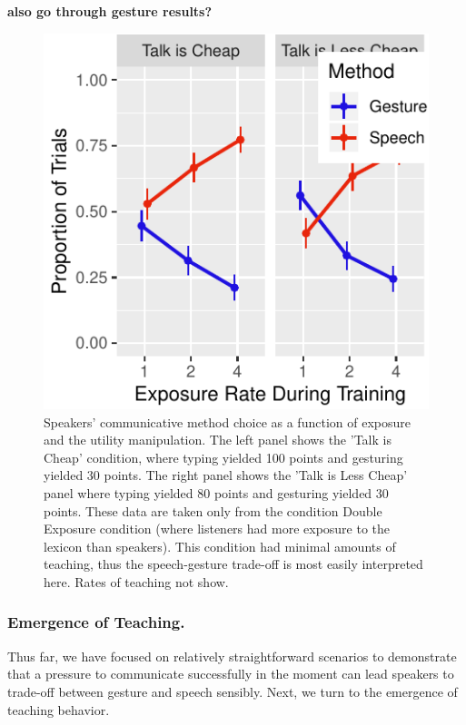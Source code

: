 \documentclass[10pt, letterpaper]{article}
\newenvironment{CodeChunk}{}{}
\begin{document}
\textbf{also go through gesture results?}

\begin{CodeChunk}
\begin{figure}[H]

{\centering \includegraphics{figs/exp_speech_gesture-1} 

}

\caption[Speakers' communicative method choice as a function of exposure and the utility manipulation]{Speakers' communicative method choice as a function of exposure and the utility manipulation. The left panel shows the 'Talk is Cheap' condition, where typing yielded 100 points and gesturing yielded 30 points. The right panel shows the 'Talk is Less Cheap' panel where typing yielded 80 points and gesturing yielded 30 points. These data are taken only from the condition Double Exposure condition (where listeners had more exposure to the lexicon than speakers). This condition had minimal amounts of teaching, thus the speech-gesture trade-off is most easily interpreted here. Rates of teaching not show.}\label{fig:exp_speech_gesture}
\end{figure}
\end{CodeChunk}

\subsubsection{Emergence of Teaching.}\label{emergence-of-teaching.}

Thus far, we have focused on relatively straightforward scenarios to
demonstrate that a pressure to communicate successfully in the moment
can lead speakers to trade-off between gesture and speech sensibly.
Next, we turn to the emergence of teaching behavior.
\end{document}
